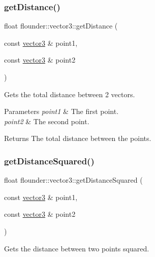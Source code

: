 \subsubsection{\texorpdfstring{get\+Distance()}{getDistance()}}
{\footnotesize\ttfamily float flounder\+::vector3\+::get\+Distance (\begin{DoxyParamCaption}\item[{const \hyperlink{classflounder_1_1vector3}{vector3} \&}]{point1,  }\item[{const \hyperlink{classflounder_1_1vector3}{vector3} \&}]{point2 }\end{DoxyParamCaption})\hspace{0.3cm}{\ttfamily [static]}}



Gets the total distance between 2 vectors. 


\begin{DoxyParams}{Parameters}
{\em point1} & The first point. \\
\hline
{\em point2} & The second point. \\
\hline
\end{DoxyParams}
\begin{DoxyReturn}{Returns}
The total distance between the points. 
\end{DoxyReturn}
\mbox{\label{classflounder_1_1vector3_ac94733c1169517aa8cfba5db58309a3a}} 
\subsubsection{\texorpdfstring{get\+Distance\+Squared()}{getDistanceSquared()}}
{\footnotesize\ttfamily float flounder\+::vector3\+::get\+Distance\+Squared (\begin{DoxyParamCaption}\item[{const \hyperlink{classflounder_1_1vector3}{vector3} \&}]{point1,  }\item[{const \hyperlink{classflounder_1_1vector3}{vector3} \&}]{point2 }\end{DoxyParamCaption})\hspace{0.3cm}{\ttfamily [static]}}



Gets the distance between two points squared. 


